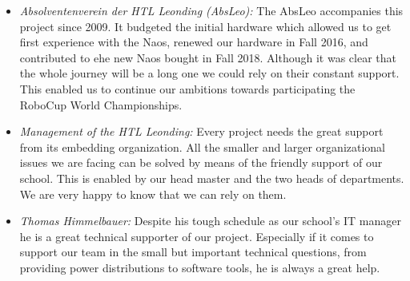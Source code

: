 \documentclass[11pt]{article}
\begin{document}
\begin{itemize}
	\item \emph{Absolventenverein der HTL Leonding (AbsLeo):} The AbsLeo accompanies this project since 2009. It budgeted the initial hardware which allowed us to get first experience with the Naos, renewed our hardware in Fall 2016, and contributed to ehe new Naos bought in Fall 2018. Although it was clear that the whole journey will be a long one we could rely on their constant support. This enabled us to continue our ambitions towards participating the RoboCup World Championships.
	
	\item \emph{Management of the HTL Leonding:} Every project needs the great support from its embedding organization. All the smaller and larger organizational issues we are facing can be solved by means of the friendly support of our school. This is enabled by our head master and the two heads of departments. We are very happy to know that we can rely on them.
	
	\item \emph{Thomas Himmelbauer:} Despite his tough schedule as our school's IT manager he is a great technical supporter of our project. Especially if it comes to support our team in the small but important technical questions, from providing power distributions to software tools, he is always a great help.
\end{itemize}
\end{document}
